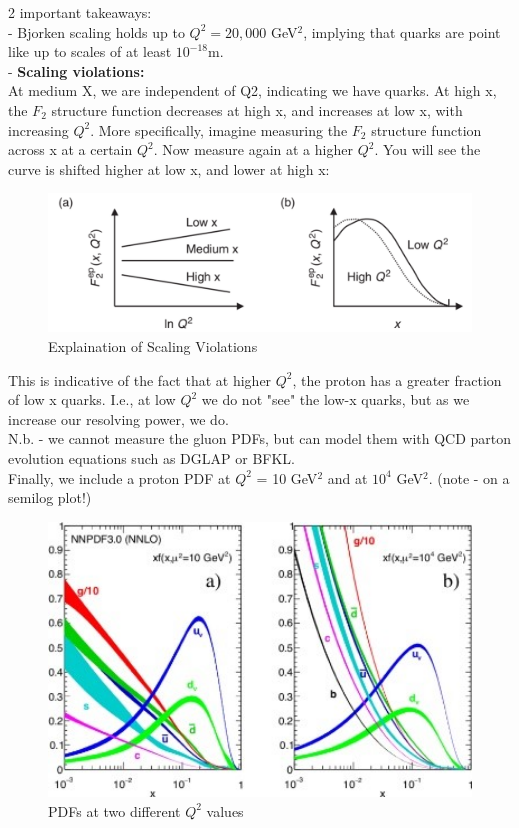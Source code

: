         2 important takeaways:\\
        - Bjorken scaling holds up to $Q^2 = 20,000$ GeV$^2$, implying that quarks are point like up to scales of at least $10^{-18}$m. \\
        - \textbf{Scaling violations: }\\
        \newline
        \indent At medium X, we are independent of Q2, indicating we have quarks. At high x, the $F_2$ structure function decreases at high x, and increases at low x, with increasing $Q^2$. More specifically, imagine measuring the $F_2$ structure function across x at a certain $Q^2$. Now measure again at a higher $Q^2$. You will see the curve is shifted higher at low x, and lower at high x:
        
                
        \begin{figure}[H]
            \centering
            \includegraphics[width=12cm]{NuclearPhysics/modules/lepton-scattering/pics/inelastic-ep/scaling-violations.PNG}
            \caption{Explaination of Scaling Violations}
        \end{figure}
        
        This is indicative of the fact that at higher $Q^2$, the proton has a greater fraction of low x quarks. I.e., at low $Q^2$ we do not "see" the low-x quarks, but as we increase our resolving power, we do.\\
        \newline
        N.b. - we cannot measure the gluon PDFs, but can model them with QCD parton evolution equations such as DGLAP or BFKL.\\
        \newline
        Finally, we include a proton PDF at $Q^2$ = 10 GeV$^2$ and at $10^4$ GeV$^2$. (note - on a semilog plot!)
        
               
        \begin{figure}[H]
            \centering
            \includegraphics[width=14cm]{NuclearPhysics/modules/lepton-scattering/pics/inelastic-ep/PDFs.jpg}
            \caption{PDFs at two different $Q^2$ values}
        \end{figure}
     
 
